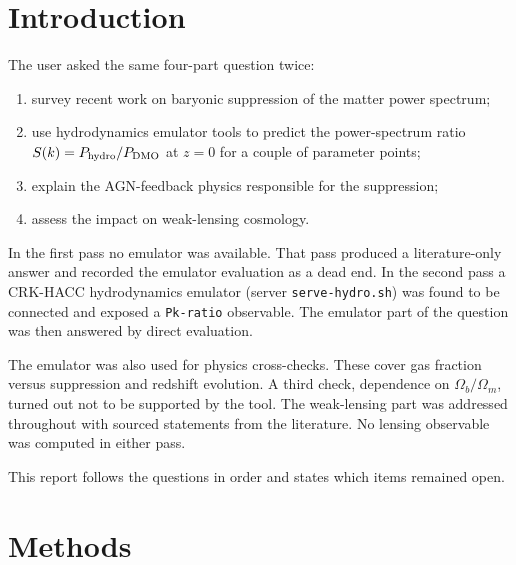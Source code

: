 \documentclass[11pt,a4paper]{article}
\begin{document}
\section{Introduction}
The user asked the same four-part question twice:
\begin{enumerate}
\item survey recent work on baryonic suppression of the matter power spectrum;
\item use hydrodynamics emulator tools to predict the power-spectrum ratio $S(k)=P_{\rm hydro}/P_{\rm DMO}$ at $z=0$ for a couple of parameter points;
\item explain the AGN-feedback physics responsible for the suppression;
\item assess the impact on weak-lensing cosmology.
\end{enumerate}

In the first pass no emulator was available. That pass produced a literature-only answer and recorded the emulator evaluation as a dead end. In the second pass a CRK-HACC hydrodynamics emulator (server \texttt{serve-hydro.sh}) was found to be connected and exposed a \texttt{Pk-ratio} observable. The emulator part of the question was then answered by direct evaluation.

The emulator was also used for physics cross-checks. These cover gas fraction versus suppression and redshift evolution. A third check, dependence on $\Omega_b/\Omega_m$, turned out not to be supported by the tool. The weak-lensing part was addressed throughout with sourced statements from the literature. No lensing observable was computed in either pass.

This report follows the questions in order and states which items remained open.

\section{Methods}
\end{document}
